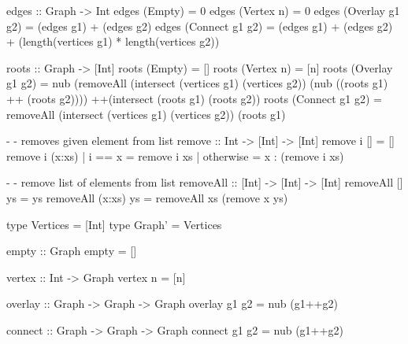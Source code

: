 \documentclass[11pt,a4paper]{article}
\begin{document}

\codesol
\ifsolutions
\begin{code}
edges :: Graph -> Int
edges (Empty)         = 0
edges (Vertex n)      = 0
edges (Overlay g1 g2) = (edges g1) + (edges g2)
edges (Connect g1 g2) = (edges g1) + (edges g2)
                      + (length(vertices g1) * length(vertices g2))
\end{code}
\fi


\codesol
\ifsolutions
\begin{code}
roots :: Graph -> [Int]
roots (Empty)         = []
roots (Vertex n)      = [n]
roots (Overlay g1 g2) = nub (removeAll (intersect (vertices g1) (vertices g2))
                        (nub ((roots g1) ++ (roots g2))))
                        ++(intersect (roots g1) (roots g2))
roots (Connect g1 g2) = removeAll (intersect (vertices g1) (vertices g2))
                        (roots g1)

- - removes given element from list
remove :: Int -> [Int] -> [Int]
remove i [] = []
remove i (x:xs)
  | i == x    = remove i xs
  | otherwise = x : (remove i xs)

- - remove list of elements from list
removeAll :: [Int] -> [Int] -> [Int]
removeAll [] ys = ys
removeAll (x:xs) ys = removeAll xs (remove x ys)
\end{code}
\fi



\codesol
\ifsolutions
\begin{code}
type Vertices = [Int]
type Graph' = Vertices

empty :: Graph
empty = []

vertex :: Int -> Graph
vertex n = [n]

overlay :: Graph -> Graph -> Graph
overlay g1 g2 = nub (g1++g2)

connect :: Graph -> Graph -> Graph
connect g1 g2 = nub (g1++g2)
\end{code}
\fi
\end{document}
